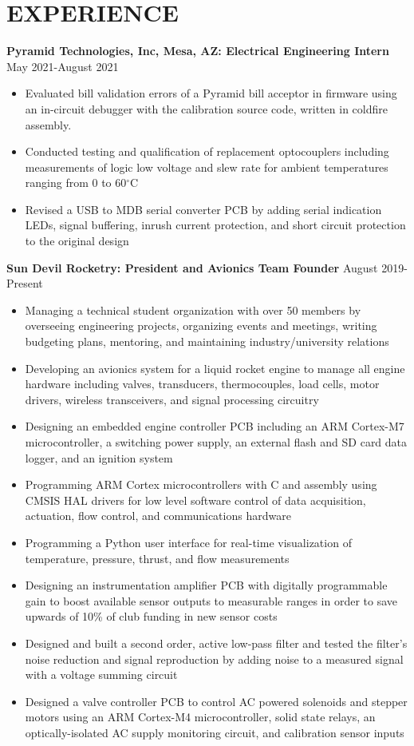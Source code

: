 \documentclass{article}
\begin{document}
\section{EXPERIENCE}
\textbf{Pyramid Technologies, Inc, Mesa, AZ: Electrical Engineering Intern}
\hfill 
\vspace{0.5em}
May 2021-August 2021
\begin{itemize}
\item{Evaluated bill validation errors of a Pyramid bill acceptor in firmware using an in-circuit debugger with the calibration source code, written in coldfire     assembly.}
\item{Conducted testing and qualification of replacement optocouplers including measurements of logic low voltage and slew rate for ambient temperatures ranging from 0 to 60$^{\circ}$C}
\item{Revised a USB to MDB serial converter PCB by adding serial indication LEDs, signal buffering, inrush current protection, and short circuit protection to the original design}
\end{itemize}
\vspace{1em}
\textbf{Sun Devil Rocketry: President and Avionics Team Founder}
\hfill
\vspace{0.5em}
August 2019-Present
\begin{itemize}
\item{Managing a technical student organization with over 50 members by overseeing engineering projects, organizing events and meetings, writing budgeting plans, mentoring, and maintaining industry/university relations}
	\item{Developing an avionics system for a liquid rocket engine to manage all engine hardware including valves, transducers, thermocouples, load cells, motor drivers, wireless transceivers, and signal processing circuitry}
\item{Designing an embedded engine controller PCB including an ARM Cortex-M7 microcontroller, a switching power supply, an external flash and SD card data logger, and an ignition system}
	\item{Programming ARM Cortex microcontrollers with C and assembly using CMSIS HAL drivers for low level software control of data acquisition, actuation, flow control, and communications hardware}
	\item{Programming a Python user interface for real-time visualization of temperature, pressure, thrust, and flow measurements}
	\item{Designing an instrumentation amplifier PCB with digitally programmable gain to boost available sensor outputs to measurable ranges in order to save upwards of 10\% of club funding in new sensor costs}
	\item{Designed and built a second order, active low-pass filter and tested the filter's noise reduction and signal reproduction by adding noise to a measured signal with a voltage summing circuit}
\item{Designed a valve controller PCB to control AC powered solenoids and stepper motors using an ARM Cortex-M4 microcontroller, solid state relays, an optically-isolated AC supply monitoring circuit, and calibration sensor inputs}
\end{itemize}
\end{document}
